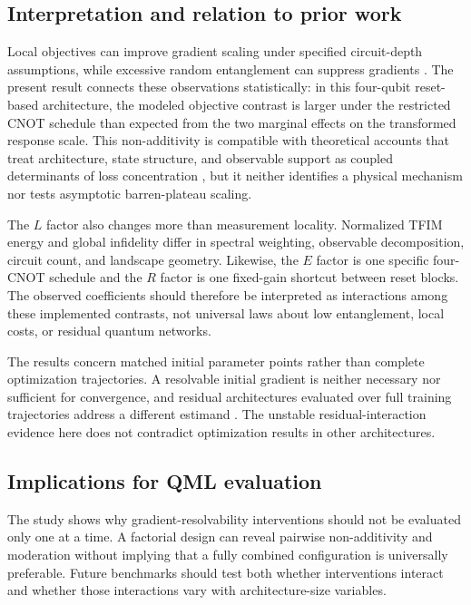 \documentclass[pdflatex,sn-basic,Numbered]{sn-jnl}
\begin{document}
\subsection{Interpretation and relation to prior work}

Local objectives can improve gradient scaling under specified circuit-depth assumptions, while excessive random entanglement can suppress gradients \cite{cerezo2021costfunction,ortizmarrero2021entanglement,patti2021entanglement}. The present result connects these observations statistically: in this four-qubit reset-based architecture, the modeled objective contrast is larger under the restricted CNOT schedule than expected from the two marginal effects on the transformed response scale. This non-additivity is compatible with theoretical accounts that treat architecture, state structure, and observable support as coupled determinants of loss concentration \cite{ragone2024lie}, but it neither identifies a physical mechanism nor tests asymptotic barren-plateau scaling.

The $L$ factor also changes more than measurement locality. Normalized TFIM energy and global infidelity differ in spectral weighting, observable decomposition, circuit count, and landscape geometry. Likewise, the $E$ factor is one specific four-CNOT schedule and the $R$ factor is one fixed-gain shortcut between reset blocks. The observed coefficients should therefore be interpreted as interactions among these implemented contrasts, not universal laws about low entanglement, local costs, or residual quantum networks.

The results concern matched initial parameter points rather than complete optimization trajectories. A resolvable initial gradient is neither necessary nor sufficient for convergence, and residual architectures evaluated over full training trajectories address a different estimand \cite{anschuetz2022traps,grant2019identity,skolik2021layerwise,kashif2024resqnets}. The unstable residual-interaction evidence here does not contradict optimization results in other architectures.

\subsection{Implications for QML evaluation}

The study shows why gradient-resolvability interventions should not be evaluated only one at a time. A factorial design can reveal pairwise non-additivity and moderation without implying that a fully combined configuration is universally preferable. Future benchmarks should test both whether interventions interact and whether those interactions vary with architecture-size variables.
\end{document}
